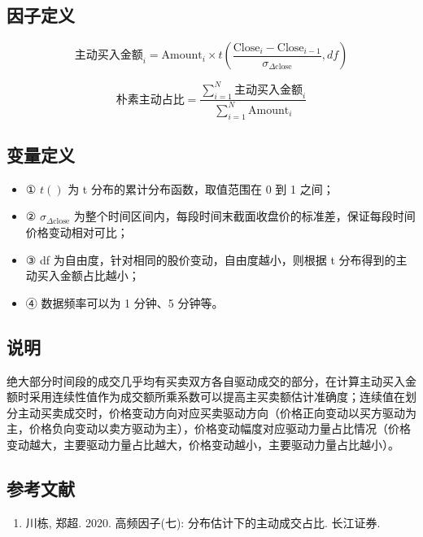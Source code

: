 \documentclass{article}
\begin{document}
\subsection{因子定义}

\begin{equation}
    \text{主动买入金额}_i = \mathrm{Amount}_i \times t \left( \frac{\mathrm{Close}_i - \mathrm{Close}_{i-1}}{\sigma_{\Delta \mathrm{close}}} ,df\right)
\end{equation}

\begin{equation}
    \text{朴素主动占比} =  \frac{\sum_{i=1}^{N}\text{主动买入金额}_i}{\sum_{i=1}^{N} \mathrm{Amount}_i} 
\end{equation}

\subsection{变量定义}
\begin{itemize}
    \item ① \( t() \) 为 t 分布的累计分布函数，取值范围在 0 到 1 之间；
    \item ② \( \sigma_{\Delta \mathrm{close}} \) 为整个时间区间内，每段时间末截面收盘价的标准差，保证每段时间价格变动相对可比；
    \item ③ df 为自由度，针对相同的股价变动，自由度越小，则根据 t 分布得到的主动买入金额占比越小；
    \item ④ 数据频率可以为 1 分钟、5 分钟等。
\end{itemize}

\subsection{说明}
绝大部分时间段的成交几乎均有买卖双方各自驱动成交的部分，在计算主动买入金额时采用连续性值作为成交额所乘系数可以提高主买卖额估计准确度；连续值在划分主动买卖成交时，价格变动方向对应买卖驱动方向（价格正向变动以买方驱动为主，价格负向变动以卖方驱动为主），价格变动幅度对应驱动力量占比情况（价格变动越大，主要驱动力量占比越大，价格变动越小，主要驱动力量占比越小）。

\subsection{参考文献}
\begin{enumerate}
    \item 川栋, 郑超. 2020. 高频因子(七): 分布估计下的主动成交占比. 长江证券.
\end{enumerate}
\end{document}
